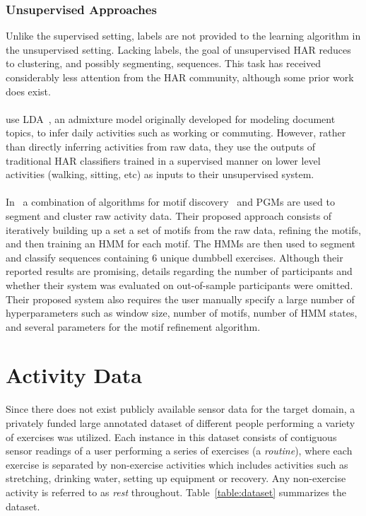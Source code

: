 \documentclass[12pt]{report}
\newcommand{\1}[0]{\mathbbm{1}}
\begin{document}
\subsection{Unsupervised Approaches}
Unlike the supervised setting, labels are not provided to the learning
algorithm in the unsupervised setting. Lacking labels, the goal of unsupervised \ac{HAR}
reduces to clustering, and possibly segmenting, sequences. This task has received considerably
less attention from the \ac{HAR} community, although some prior work does exist.
\\\\
\cite{har-topic-models} use \ac{LDA}~\cite{lda-blei}, an admixture model originally
developed for modeling document topics, to infer daily activities such as working or
commuting. However, rather than directly inferring activities from raw data, they use the
outputs of traditional \ac{HAR} classifiers trained in a supervised manner on lower level
activities (walking, sitting, etc) as inputs to their unsupervised system.
\\\\
In~\cite{hmm-motifs} a combination of algorithms for motif discovery~\cite{motif-algo} and \acp{PGM}
are used to segment and cluster raw activity data. Their proposed approach consists of
iteratively building up a set a set of motifs from the raw data, refining the motifs,
and then training an \ac{HMM} for each motif. The \acp{HMM} are then used to segment and classify
sequences containing 6 unique dumbbell exercises. Although their reported results are promising,
details regarding the number of participants and whether their system was evaluated on
out-of-sample participants were omitted. Their proposed system also requires the user manually
specify a large number of hyperparameters such as window size, number of motifs, number of \ac{HMM} states,
and several parameters for the motif refinement algorithm.

\chapter{Activity Data}
\label{chap:Activity Data}
Since there does not exist publicly available sensor data for the target domain, a privately funded
large annotated dataset of different people performing a variety of exercises was utilized.
Each instance in this dataset consists of contiguous sensor readings of a user performing a
series of exercises (a \emph{routine}), where each exercise is separated by non-exercise activities
which includes activities such as stretching, drinking water, setting up  equipment or recovery.
Any non-exercise activity is referred to as \emph{rest} throughout. Table~\ref{table:dataset} summarizes
the dataset.
\end{document}
